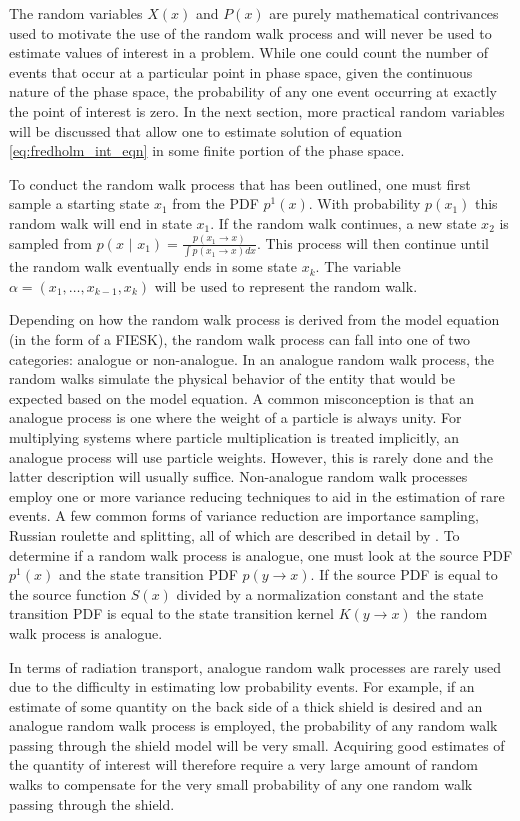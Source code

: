 The random variables $X(x)$ and $P(x)$ are purely mathematical contrivances
used to motivate the use of the random walk process and will never be used 
to estimate values of interest in a problem. While one could count the
number of events that occur at a particular point in phase space, given the 
continuous nature of the phase space, the probability of any one event 
occurring at exactly the point of interest is zero. In the next section, more 
practical random variables will be discussed that allow one to estimate 
solution of equation \ref{eq:fredholm_int_eqn} in some finite portion of the 
phase space.

To conduct the random walk process that has been outlined, one must first 
sample a starting state $x_1$ from the PDF $p^1(x)$. With probability $p(x_1)$ 
this random walk will end in state $x_1$. If the random walk continues, a new 
state $x_2$ is sampled from 
$p(x \text{ | } x_1) = \frac{p(x_1 \to x)}{\int p(x_1 \to x)dx}$. This process will then continue 
until the random walk eventually ends in some state $x_k$. The variable 
$\alpha = (x_1,\ldots,x_{k-1},x_k)$ will be used to represent the random 
walk. 

Depending on how the random walk process is derived from the model equation (in
the form of a FIESK), the random walk process can fall into one of two 
categories: analogue or non-analogue. In an analogue random walk process, the 
random walks simulate the physical behavior of the entity that would be 
expected based on the model equation. A common misconception is that an 
analogue process is one where the weight of a particle is always unity. For 
multiplying systems where particle multiplication is treated implicitly, an 
analogue process will use particle weights. However, this is rarely done and 
the latter description will usually suffice. Non-analogue random walk processes 
employ one or more variance reducing techniques to aid in the estimation of 
rare events. A few common forms of variance reduction are importance sampling, 
Russian roulette and splitting, all of which are described in detail by 
\citet{spanier_monte_1969}. To determine if a random walk process is analogue, 
one must look at the source PDF $p^1(x)$ and the state transition PDF
$p(y \to x)$. If the source PDF is equal to the source function $S(x)$ divided 
by a normalization constant and the state transition PDF is equal to the state 
transition kernel $K(y \to x)$ the random walk process is analogue. 

In terms of radiation transport, analogue random walk processes are 
rarely used due to the difficulty in estimating low probability events. For
example, if an estimate of some quantity on the back side of a thick shield is 
desired and an analogue random walk process is employed, the probability of any 
random walk passing through the shield model will be very small. Acquiring good
estimates of the quantity of interest will therefore require a very large
amount of random walks to compensate for the very small probability of any one
random walk passing through the shield. 

